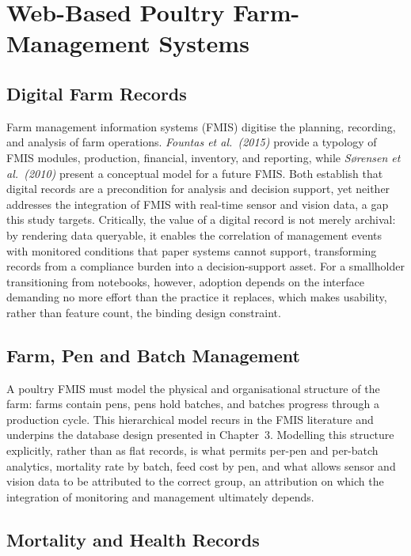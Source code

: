 \documentclass[12pt,a4paper]{report}
\begin{document}
\section{Web-Based Poultry Farm-Management Systems}

\subsection{Digital Farm Records}

Farm management information systems (FMIS) digitise the planning, recording, and analysis of farm operations. \textit{Fountas et al.\ (2015)} provide a typology of FMIS modules, production, financial, inventory, and reporting, while \textit{S{\o}rensen et al.\ (2010)} present a conceptual model for a future FMIS. Both establish that digital records are a precondition for analysis and decision support, yet neither addresses the integration of FMIS with real-time sensor and vision data, a gap this study targets. Critically, the value of a digital record is not merely archival: by rendering data queryable, it enables the correlation of management events with monitored conditions that paper systems cannot support, transforming records from a compliance burden into a decision-support asset. For a smallholder transitioning from notebooks, however, adoption depends on the interface demanding no more effort than the practice it replaces, which makes usability, rather than feature count, the binding design constraint.

\subsection{Farm, Pen and Batch Management}

A poultry FMIS must model the physical and organisational structure of the farm: farms contain pens, pens hold batches, and batches progress through a production cycle. This hierarchical model recurs in the FMIS literature and underpins the database design presented in Chapter~3. Modelling this structure explicitly, rather than as flat records, is what permits per-pen and per-batch analytics, mortality rate by batch, feed cost by pen, and what allows sensor and vision data to be attributed to the correct group, an attribution on which the integration of monitoring and management ultimately depends.

\subsection{Mortality and Health Records}
\end{document}
